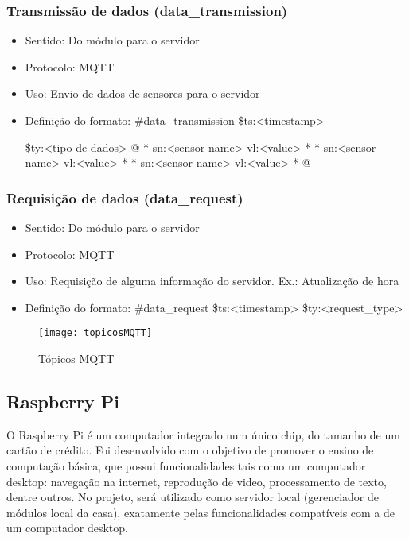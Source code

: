 \subsubsection{Transmissão de dados (data\_transmission)}
\begin{itemize}
\item Sentido: Do módulo para o servidor
\item Protocolo: MQTT
\item Uso: Envio de dados de sensores para o servidor
\item Definição do formato:
\#data\_transmission
\$ts:\textless timestamp\textgreater

\$ty:\textless tipo de dados\textgreater
@
*
sn:\textless sensor name\textgreater
vl:\textless value\textgreater
*
*
sn:\textless sensor name\textgreater
vl:\textless value\textgreater
*
*
sn:\textless sensor name\textgreater
vl:\textless value\textgreater
*
@
\end{itemize}

\subsubsection{Requisição de dados (data\_request)}
\begin{itemize}
\item Sentido: Do módulo para o servidor
\item Protocolo: MQTT
\item Uso: Requisição de alguma informação do servidor. Ex.: Atualização de hora
\item Definição do formato:
\#data\_request
\$ts:\textless timestamp\textgreater
\$ty:\textless request\_type\textgreater
\end{itemize}

\begin{figure}[H]
	\centering
\caption{Tópicos MQTT}
  \texttt{[image: topicosMQTT]}
\label{fig:topicosMQTT}
\end{figure}

\subsection{Raspberry Pi}
O Raspberry Pi é um computador integrado num único chip, do tamanho de um cartão de crédito. Foi desenvolvido com o objetivo de promover o ensino de computação básica, que possui funcionalidades tais como um computador desktop: navegação na internet, reprodução de video, processamento de texto, dentre outros. No projeto, será utilizado como servidor local (gerenciador de módulos local da casa), exatamente pelas funcionalidades compatíveis com a de um computador desktop.

